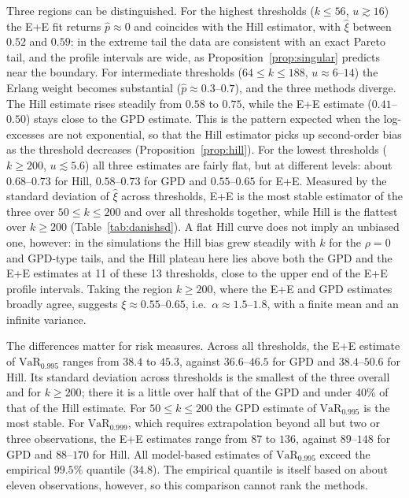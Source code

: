 \documentclass[12pt]{article}
\theoremstyle{definition}
\theoremstyle{remark}
\newcommand{\VaR}{\mathrm{VaR}}
\begin{document}
Three regions can be distinguished. For the highest thresholds ($k\le56$, $u\gtrsim16$) the E+E fit returns $\hat p\approx0$ and coincides with the Hill estimator, with $\hat\xi$ between $0.52$ and $0.59$: in the extreme tail the data are consistent with an exact Pareto tail, and the profile intervals are wide, as Proposition~\ref{prop:singular} predicts near the boundary. For intermediate thresholds ($64\le k\le188$, $u\approx6$--$14$) the Erlang weight becomes substantial ($\hat p\approx0.3$--$0.7$), and the three methods diverge. The Hill estimate rises steadily from $0.58$ to $0.75$, while the E+E estimate ($0.41$--$0.50$) stays close to the GPD estimate. This is the pattern expected when the log-excesses are not exponential, so that the Hill estimator picks up second-order bias as the threshold decreases (Proposition~\ref{prop:hill}). For the lowest thresholds ($k\ge200$, $u\lesssim5.6$) all three estimates are fairly flat, but at different levels: about $0.68$--$0.73$ for Hill, $0.58$--$0.73$ for GPD and $0.55$--$0.65$ for E+E. Measured by the standard deviation of $\hat\xi$ across thresholds, E+E is the most stable estimator of the three over $50\le k\le200$ and over all thresholds together, while Hill is the flattest over $k\ge200$ (Table~\ref{tab:danishsd}). A flat Hill curve does not imply an unbiased one, however: in the simulations the Hill bias grew steadily with $k$ for the $\rho=0$ and GPD-type tails, and the Hill plateau here lies above both the GPD and the E+E estimates at 11 of these 13 thresholds, close to the upper end of the E+E profile intervals. Taking the region $k\ge200$, where the E+E and GPD estimates broadly agree, suggests $\xi\approx0.55$--$0.65$, i.e.\ $\alpha\approx1.5$--$1.8$, with a finite mean and an infinite variance.

The differences matter for risk measures. Across all thresholds, the E+E estimate of $\VaR_{0.995}$ ranges from $38.4$ to $45.3$, against $36.6$--$46.5$ for GPD and $38.4$--$50.6$ for Hill. Its standard deviation across thresholds is the smallest of the three overall and for $k\ge200$; there it is a little over half that of the GPD and under 40\% of that of the Hill estimate. For $50\le k\le200$ the GPD estimate of $\VaR_{0.995}$ is the most stable. For $\VaR_{0.999}$, which requires extrapolation beyond all but two or three observations, the E+E estimates range from $87$ to $136$, against $89$--$148$ for GPD and $88$--$170$ for Hill. All model-based estimates of $\VaR_{0.995}$ exceed the empirical $99.5\%$ quantile ($34.8$). The empirical quantile is itself based on about eleven observations, however, so this comparison cannot rank the methods.
\end{document}
